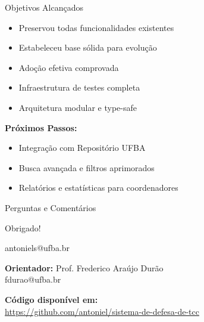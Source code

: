 \documentclass[aspectratio=169,xcolor=table]{beamer}
\begin{document}
\begin{frame}{Objetivos Alcançados}
    \begin{itemize}
        \item  Preservou todas funcionalidades existentes
        \item  Estabeleceu base sólida para evolução
        \item  Adoção efetiva comprovada
        \item  Infraestrutura de testes completa
        \item  Arquitetura modular e type-safe
    \end{itemize}
    
    \vspace{1em}
    \textbf{Próximos Passos:}
    \begin{itemize}
        \item Integração com Repositório UFBA
        \item Busca avançada e filtros aprimorados
        \item Relatórios e estatísticas para coordenadores
    \end{itemize}
\end{frame}


\begin{frame}{Perguntas e Comentários}
    \begin{center}
        \Huge Obrigado!
        
        \vspace{1.5em}
        \Large
        antoniels@ufba.br
        
        \vspace{1.5em}
        \normalsize
        \textbf{Orientador:} Prof. Frederico Araújo Durão \\
        fdurao@ufba.br
        
        \vspace{1em}
        \textbf{Código disponível em:} \\
        \url{https://github.com/antoniel/sistema-de-defesa-de-tcc}
    \end{center}
\end{frame}
\end{document}
